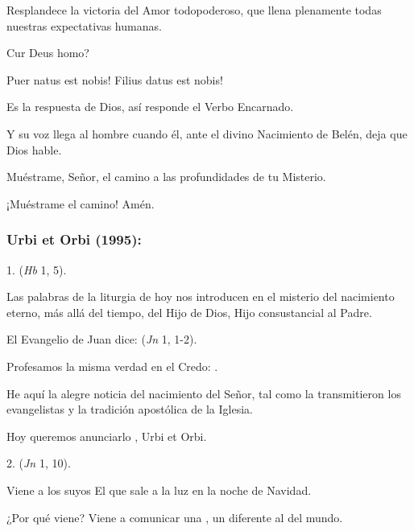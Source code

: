 \begin{body}
\begin{body}
		Resplandece la victoria del Amor todopoderoso, que llena plenamente todas nuestras expectativas humanas.

		Cur Deus homo?

		Puer natus est nobis! Filius datus est nobis!

		Es la respuesta de Dios, así responde el Verbo Encarnado.

		Y su voz llega al hombre cuando él, ante el divino Nacimiento de Belén, deja que Dios hable.

		Muéstrame, Señor, el camino a las profundidades de tu Misterio.

		¡Muéstrame el camino! Amén.
	\end{body}

	\subsubsection{Urbi et Orbi (1995):}

	\begin{body}
		1.  (\emph{Hb} 1, 5).

		Las palabras de la liturgia de hoy nos introducen en el misterio del nacimiento eterno, más allá del tiempo, del Hijo de Dios, Hijo consustancial al Padre.

		El Evangelio de Juan dice:  (\emph{Jn} 1, 1-2).

		Profesamos la misma verdad en el Credo: .

		He aquí la alegre noticia del nacimiento del Señor, tal como la transmitieron los evangelistas y la tradición apostólica de la Iglesia.

		Hoy queremos anunciarlo , Urbi et Orbi.

		2.  (\emph{Jn} 1, 10).

		Viene a los suyos El que sale a la luz en la noche de Navidad.

		¿Por qué viene? Viene a comunicar una , un  diferente al del mundo.


\end{body}
\end{body}
